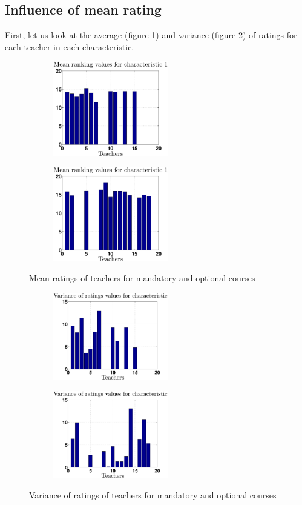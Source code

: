 \documentclass[12pt,a4paper]{article}
\begin{document}
\FloatBarrier
\subsection*{Influence of mean rating}
First, let us look at the average (figure \ref{mean1}) and variance (figure \ref{var1}) of ratings for each teacher in each characteristic.
\begin{figure}[h!]
\centering
\begin{subfigure}[b]{0.49\textwidth}
\includegraphics[width = 5cm]{noPreprocess/meanTeachersC1.eps}
\end{subfigure}
\begin{subfigure}[b]{0.49\textwidth}
\includegraphics[width = 5cm]{noPreprocess/meanTeachersC2.eps}
\end{subfigure}
\caption{Mean ratings of teachers for mandatory and optional courses\label{mean1}}
\end{figure}
\begin{figure}[h!]
\centering
\begin{subfigure}[b]{0.49\textwidth}
\includegraphics[width = 5cm]{noPreprocess/varTeachersC1.eps}
\end{subfigure}
\begin{subfigure}[b]{0.49\textwidth}
\includegraphics[width = 5cm]{noPreprocess/varTeachersC2.eps}
\end{subfigure}
\caption{Variance of ratings of teachers for mandatory and optional courses\label{var1}}
\end{figure}
\end{document}
